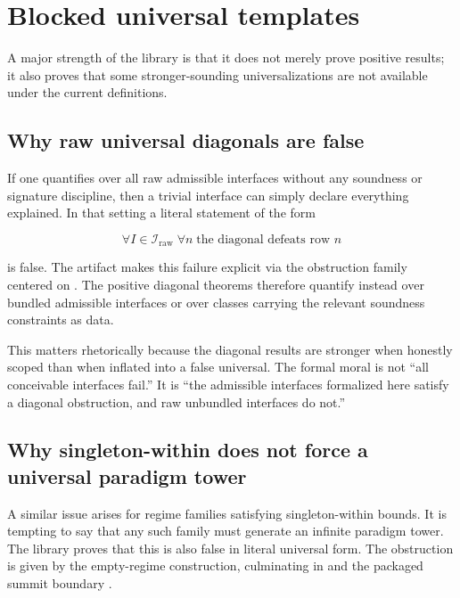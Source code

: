 \documentclass[11pt,a4paper]{article}
\theoremstyle{definition}
\begin{document}
\section{Blocked universal templates}\label{sec:blocked-universals}

A major strength of the library is that it does not merely prove positive results; it also proves that some stronger-sounding universalizations are not available under the current definitions.

\subsection{Why raw universal diagonals are false}

If one quantifies over all raw admissible interfaces without any soundness or signature discipline, then a trivial interface can simply declare everything explained. In that setting a literal statement of the form

\[
\forall I \in \mathcal{I}_{\mathrm{raw}}\;\forall n\; \text{the diagonal defeats row } n
\]

is false. The artifact makes this failure explicit via the obstruction family centered on . The positive diagonal theorems therefore quantify instead over bundled admissible interfaces or over classes carrying the relevant soundness constraints as data.

This matters rhetorically because the diagonal results are stronger when honestly scoped than when inflated into a false universal. The formal moral is not ``all conceivable interfaces fail.'' It is ``the admissible interfaces formalized here satisfy a diagonal obstruction, and raw unbundled interfaces do not.''

\subsection{Why singleton-within does not force a universal paradigm tower}

A similar issue arises for regime families satisfying singleton-within bounds. It is tempting to say that any such family must generate an infinite paradigm tower. The library proves that this is also false in literal universal form. The obstruction is given by the empty-regime construction, culminating in  and the packaged summit boundary .
\end{document}
